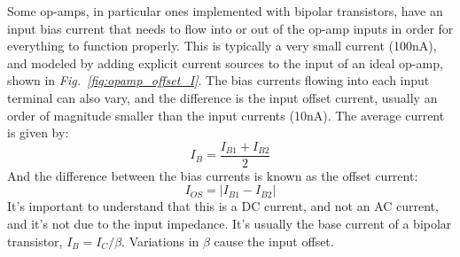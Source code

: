 Some op-amps, in particular ones implemented with bipolar transistors, have an input bias current that needs to flow into or out of the op-amp inputs in order for everything to function properly. This is typically a very small current (100nA), and modeled by adding explicit current sources to the input of an ideal op-amp, shown in \emph{Fig.~\ref{fig:opamp_offset_I}}.  The bias currents flowing into each input terminal can also vary, and the difference is the input offset current, usually an order of magnitude smaller than the input currents (10nA).  The average current is given by:
\begin{equation}
       I_B = \frac{I_{B1}+I_{B2}}{2}
\end{equation}
And the difference between the bias currents is known as the offset current:
\begin{equation}
        I_{OS} = |I_{B1} - I_{B2} |
\end{equation}
It's important to understand that this is a DC current, and not an AC current, and it's not due to the input impedance.  It's usually the base current of a bipolar transistor, $I_B = I_C/\beta$.  Variations in $\beta$ cause the input offset.
